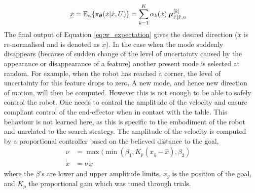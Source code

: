 \begin{equation}\label{eq:w_expectation}
 \underline{\dot{x}} = \mathbb{E}_{\alpha}\{\pi_{\boldsymbol{\theta}}(\dot{x}|\hat{x},U)\} = \sum\limits_{k=1}^{K} \alpha_{k}(\dot{x}) \:\boldsymbol{\mu}^{[k]}_{\dot{x}|\hat{x},u}
\end{equation}
% 
%
The final output of Equation \ref{eq:w_expectation} gives the desired direction
($\dot{x}$ is re-normalised and is denoted as $\underline{\dot{x}}$). In the case when the mode suddenly disappears
(because of sudden change of the level of uncertainty caused by the appearance or disappearance of a feature)
another present mode is selected at random. For example, when the robot has reached a corner, the level of uncertainty for this feature drops to zero.
A new mode, and hence new direction of motion, will then  be computed.
However this is not enough to be able to safely control the robot.
One needs to control the amplitude of the velocity and ensure compliant control 
of the end-effector when in contact with the table. This behaviour is not learned here, as this is specific to 
the embodiment of the robot and unrelated to the search strategy. The 
amplitude of the velocity is computed by a proportional controller based on the
believed distance to the goal,
\begin{align}
     \nu &= \max(\min(\beta_{1},K_{p}(x_{\mathrm{g}} - \hat{x}),\beta_{2}) \\ \nonumber
 \dot{x} &=  \nu\,\underline{\dot{x}}
\end{align}
where the $\beta$'s are lower and upper amplitude limits, $x_{g}$ is the
position of the goal, and $K_{p}$ the proportional gain which was tuned through
trials.

%
%

